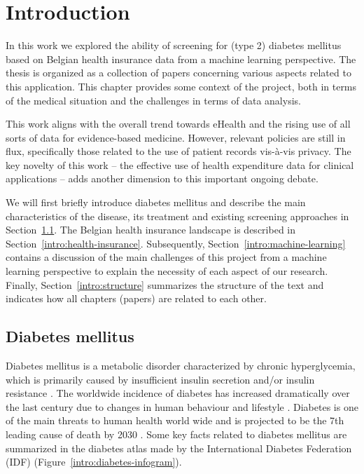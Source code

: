 \chapter{Introduction}\label{ch:introduction}

In this work we explored the ability of screening for (type 2) diabetes mellitus based on Belgian health insurance data from a machine learning perspective. The thesis is organized as a collection of papers concerning various aspects related to this application. This chapter provides some context of the project, both in terms of the medical situation and the challenges in terms of data analysis. 

This work aligns with the overall trend towards eHealth and the rising use of all sorts of data for evidence-based medicine. However, relevant policies are still in flux, specifically those related to the use of patient records vis-\`a-vis privacy. The key novelty of this work -- the effective use of health expenditure data for clinical applications -- adds another dimension to this important ongoing debate.

We will first briefly introduce diabetes mellitus and describe the main characteristics of the disease, its treatment and existing screening approaches in Section~\ref{intro:diabetes}. The Belgian health insurance landscape is described in Section~\ref{intro:health-insurance}. Subsequently, Section~\ref{intro:machine-learning} contains a discussion of the main challenges of this project from a machine learning perspective to explain the necessity of each aspect of our research. Finally, Section~\ref{intro:structure} summarizes the structure of the text and indicates how all chapters (papers) are related to each other.



\section{Diabetes mellitus} \label{intro:diabetes}
Diabetes mellitus is a metabolic disorder characterized by chronic hyperglycemia, which is primarily caused by insufficient insulin secretion and/or insulin resistance \citep{alberti1998definition}. The worldwide incidence of diabetes has increased dramatically over the last century due to changes in human behaviour and lifestyle \citep{zimmet2001global, chen2012worldwide}. Diabetes is one of the main threats to human health world wide \citep{king1998global, zimmet2001global, zimmet2000globalization} and is projected to be the 7th leading cause of death by 2030 \citep{mathers2006projections}. Some key facts related to diabetes mellitus are summarized in the diabetes atlas made by the International Diabetes Federation (IDF) (Figure~\ref{intro:diabetes-infogram}).


